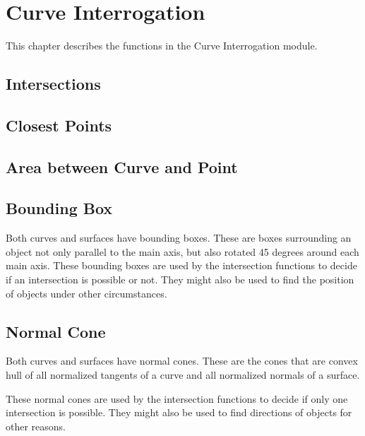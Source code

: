 \chapter{Curve Interrogation}
\label{curveinterrogation}
This chapter describes the functions in the Curve Interrogation module.
\section{Intersections}


\pgsbreak

\pgsbreak

\pgsbreak

\pgsbreak

\pgsbreak

\pgsbreak

\pgsbreak

\pgsbreak

\pgsbreak

\pgsbreak
\section{Closest Points}

\pgsbreak

\pgsbreak

\pgsbreak

\pgsbreak

\pgsbreak

\pgsbreak
\section{Area between Curve and Point}

\pgsbreak

\pgsbreak
\section{Bounding Box}
Both curves and surfaces have bounding boxes. These are boxes surrounding an object not only parallel to the main axis, but also rotated 45 degrees around each main axis. These bounding boxes are used by the intersection functions to decide if an intersection is possible or not. They might also be used to find the position of objects under other circumstances.

\pgsbreak

\pgsbreak
\section {Normal Cone}
Both curves and surfaces have normal cones. These are the cones that are convex hull of all normalized tangents of a curve and all normalized normals of a surface.

These normal cones are used by the intersection functions to decide if only one intersection is possible. They might also be used to find directions of objects for other reasons.

\pgsbreak

